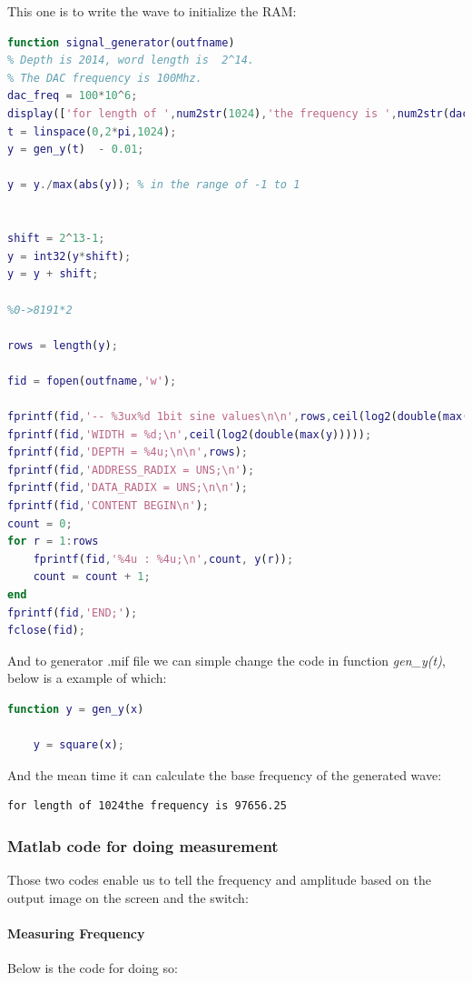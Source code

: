 \documentclass[11pt]{scrartcl}
\begin{document}
This one is to write the wave to initialize the RAM:
\begin{lstlisting}[language=Matlab]
function signal_generator(outfname)
% Depth is 2014, word length is  2^14.
% The DAC frequency is 100Mhz.
dac_freq = 100*10^6;
display(['for length of ',num2str(1024),'the frequency is ',num2str(dac_freq/1024)])
t = linspace(0,2*pi,1024);
y = gen_y(t)  - 0.01;

y = y./max(abs(y)); % in the range of -1 to 1


shift = 2^13-1;
y = int32(y*shift);
y = y + shift;

%0->8191*2

rows = length(y);

fid = fopen(outfname,'w');

fprintf(fid,'-- %3ux%d 1bit sine values\n\n',rows,ceil(log2(double(max(y)))));
fprintf(fid,'WIDTH = %d;\n',ceil(log2(double(max(y)))));
fprintf(fid,'DEPTH = %4u;\n\n',rows);
fprintf(fid,'ADDRESS_RADIX = UNS;\n');
fprintf(fid,'DATA_RADIX = UNS;\n\n');
fprintf(fid,'CONTENT BEGIN\n');
count = 0;
for r = 1:rows
    fprintf(fid,'%4u : %4u;\n',count, y(r));
    count = count + 1;
end
fprintf(fid,'END;');
fclose(fid);
\end{lstlisting}

And to generator .mif file we can simple change the code in function \textit{gen\_y(t)}, below is a example of which:

\begin{lstlisting}[language=Matlab]
function y = gen_y(x)

    y = square(x);
\end{lstlisting}

And the mean time it can calculate the base frequency of the generated wave:
\begin{verbatim}
for length of 1024the frequency is 97656.25
\end{verbatim}


\subsubsection{Matlab code for doing measurement}

Those two codes enable us to tell the frequency and amplitude based on the output image on the screen and the switch:
\paragraph{Measuring Frequency}


Below is the code for doing so:
\end{document}
